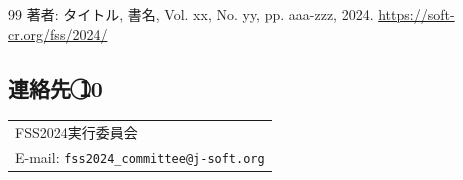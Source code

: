 \documentclass[a4paper,10pt,twocolumn]{myjarticle2}
\begin{document}
\begin{thebibliography}{99}
著者: タイトル, 書名, Vol. xx, No. yy, pp. aaa-zzz, 2024. \url{https://soft-cr.org/fss/2024/}
\end{thebibliography}
\vspace{-1mm}\par\noindent
\subsection*{連絡先{ \textcircled{10} }}\noindent
\begin{tabular}{l}
FSS2024実行委員会 \\
E-mail: {\tt  fss2024\_committee@j-soft.org}
\end{tabular}
\end{document}
